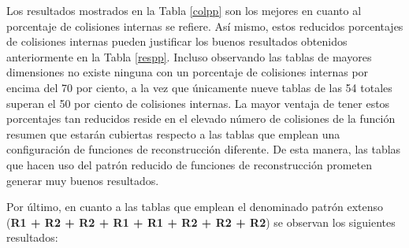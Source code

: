 \documentclass[12pt,spanish,listoffigures,listoftables,listofalgorithms]{tfgetsinf}
\begin{document}
Los resultados mostrados en la Tabla \ref{colpp} son los mejores en cuanto al porcentaje de colisiones internas se refiere. Así mismo, estos reducidos porcentajes de colisiones internas pueden justificar los buenos resultados obtenidos anteriormente en la Tabla \ref{respp}. Incluso observando las tablas de mayores dimensiones no existe ninguna con un porcentaje de colisiones internas por encima del 70 por ciento, a la vez que únicamente nueve tablas de las 54 totales superan el 50 por ciento de colisiones internas. La mayor ventaja de tener estos porcentajes tan reducidos reside en el elevado número de colisiones de la función resumen que estarán cubiertas respecto a las tablas que emplean una configuración de funciones de reconstrucción diferente. De esta manera, las tablas que hacen uso del patrón reducido de funciones de reconstrucción prometen generar muy buenos resultados.

Por último, en cuanto a las tablas que emplean el denominado patrón extenso (\textbf{R1 + R2 + R2 + R1 + R1 + R2 + R2 + R2}) se observan los siguientes resultados:
\end{document}
